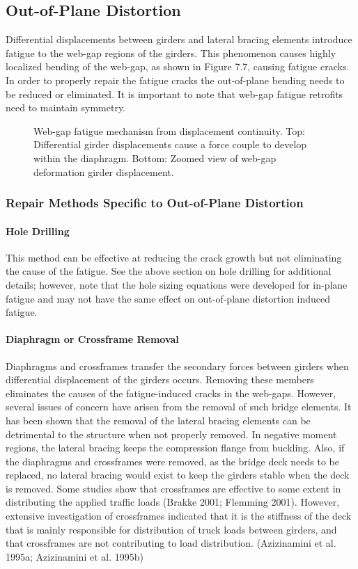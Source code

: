 \subsection{Out-of-Plane Distortion}
Differential displacements between girders and lateral bracing elements introduce fatigue to the web-gap regions
of the girders. This phenomenon causes highly localized bending of the web-gap, as shown in Figure 7.7, causing
fatigue cracks. In order to properly repair the fatigue cracks the out-of-plane bending needs to be reduced or
eliminated. It is important to note that web-gap fatigue retrofits need to maintain symmetry.

\begin{figure}
  \caption{Web-gap fatigue mechanism from displacement continuity. Top: Differential girder displacements cause a force couple to develop within the diaphragm. Bottom: Zoomed view of web-gap deformation girder displacement.}
  \label{fig:web-gap-fatigue}
\end{figure}

\subsubsection{Repair Methods Specific to Out-of-Plane Distortion}
\paragraph{Hole Drilling}
This method can be effective at reducing the crack growth but not eliminating the cause of the fatigue. See the
above section on hole drilling for additional details; however, note that the hole sizing equations were developed for
in-plane fatigue and may not have the same effect on out-of-plane distortion induced fatigue.
\paragraph{Diaphragm or Crossframe Removal}
Diaphragms and crossframes transfer the secondary forces between girders when differential displacement of the
girders occurs. Removing these members eliminates the causes of the fatigue-induced cracks in the web-gaps.
However, several issues of concern have arisen from the removal of such bridge elements. It has been shown that the
removal of the lateral bracing elements can be detrimental to the structure when not properly removed. In negative
moment regions, the lateral bracing keeps the compression flange from buckling. Also, if the diaphragms and
crossframes were removed, as the bridge deck needs to be replaced, no lateral bracing would exist to keep the girders
stable when the deck is removed. Some studies show that crossframes are effective to some extent in distributing the applied traffic loads (Brakke 2001; Flemming 2001). However, extensive investigation of crossframes indicated that
it is the stiffness of the deck that is mainly responsible for distribution of truck loads between girders, and that
crossframes are not contributing to load distribution. (Azizinamini et al. 1995a; Azizinamini et al. 1995b)
